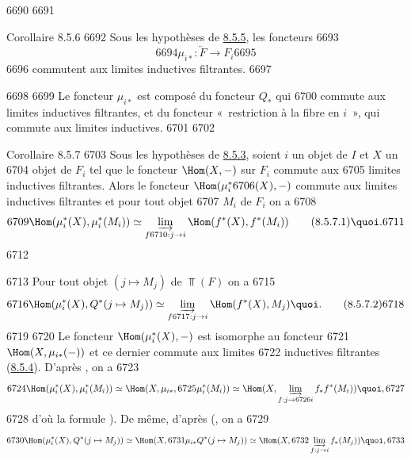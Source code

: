   6690	
  6691	\begin{enonce*}{Corollaire 8.5.6}
  6692	Sous les hypothèses de \hyperref[VI.cor8.5.5]{8.5.5}, les foncteurs
  6693	$$
  6694	\mu_{i\ast} : \underleftarrow{F} \to F_i
  6695	$$
  6696	commutent aux limites inductives filtrantes.
  6697	\end{enonce*}
  6698	
  6699	Le foncteur $\mu_{i\ast}$ est composé du foncteur $Q_{\ast}$ qui
  6700	commute aux limites inductives filtrantes, et du foncteur « restriction à la fibre en $i$ », qui commute aux limites inductives.
  6701	
  6702	\begin{enonce*}{Corollaire 8.5.7}
  6703	Sous les hypothèses de \hyperref[VI.prop8.5.3]{8.5.3}, soient $i$ un objet de $I$ et $X$ un
  6704	objet de $F_i$ tel que le foncteur $\Hom(X, -)$ sur $F_i$ commute aux
  6705	limites inductives filtrantes. Alors le foncteur $\Hom(\mu^{\ast}_i
  6706	(X), -)$ commute aux limites inductives filtrantes et pour tout objet
  6707	$M_i$ de $F_i$ on a
  6708	\begin{equation*}
  6709	\Hom(\mu^{\ast}_i(X), \mu^{\ast}_i(M_i)) \simeq \varinjlim_{f
  6710	: j \to i} \Hom(f^{\ast}(X), f^{\ast}(M_i))\tag{8.5.7.1}{\quoi}.
  6711	\end{equation*}
  6712	\end{enonce*}
  6713		Pour tout objet $(j \mapsto M_j)$ de $\Top(F)$ on a
  6715	\begin{equation*}
  6716	\Hom(\mu^{\ast}_i(X), Q^{\ast}(j \mapsto M_j)) \simeq \varinjlim_{f
  6717	: j \to i} \Hom(f^{\ast}(X), M_{j}){\quoi}.\tag{8.5.7.2}
  6718	\end{equation*}
  6719	
  6720	Le foncteur $\Hom(\mu^{\ast}_i (X), -)$ est isomorphe au foncteur
  6721	$\Hom(X, \mu_{i \ast} (-))$ et ce dernier commute aux limites
  6722	inductives filtrantes (\hyperref[VI.cor8.5.4]{8.5.4}). D'après , on a
  6723	$$
  6724	\Hom(\mu^{\ast}_i(X), \mu^{\ast}_i (M_i)) \simeq \Hom (X, \mu_{i\ast},
  6725	  \mu^{\ast}_i (M_i)) \simeq  \Hom(X, \varinjlim_{f : j \to
  6726	  i} f_{\ast} f^{\ast} (M_i)){\quoi},
  6727	$$
  6728	d'où la formule ). De même, d'après (, on a
  6729	$$
  6730	\Hom(\mu^{\ast}_i (X), Q^{\ast}(j \mapsto M_j)) \simeq \Hom(X,
  6731	\mu_{i\ast} Q^{\ast} (j \mapsto M_j)) \simeq \Hom(X,
  6732	\varinjlim_{f : j \to i} f_{\ast} (M_j)){\quoi},
  6733	$$
